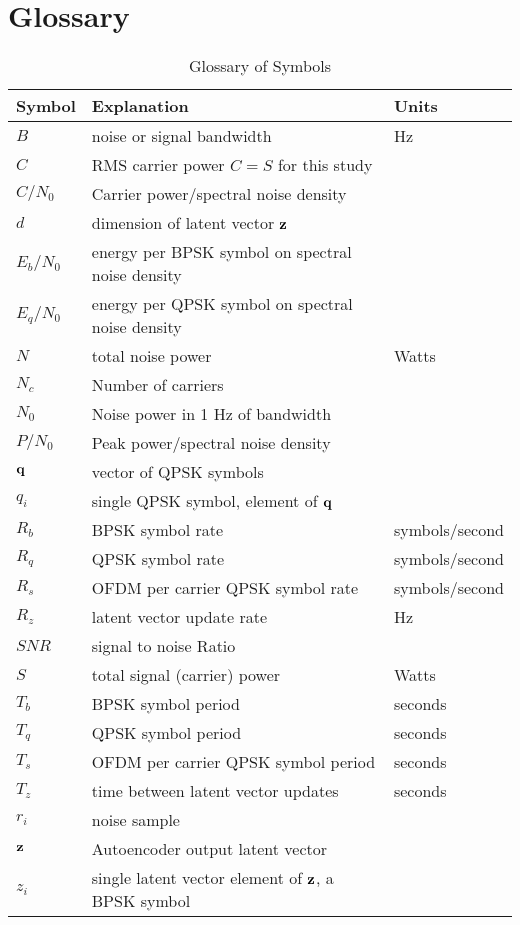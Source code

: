 \documentclass{article}
\begin{document}
\section{Glossary}

\begin{table} [H]
\centering
\begin{tabular}{l l l}
 \hline
 Symbol & Explanation & Units \\
 \hline
 $B$ & noise or signal bandwidth & Hz \\
 $C$ & RMS carrier power $C=S$ for this study \\
 $C/N_0$ & Carrier power/spectral noise density \\
 $d$ & dimension of latent vector $\bf{z}$ \\
 $E_b/N_0$ & energy per BPSK symbol on spectral noise density \\
 $E_q/N_0$ & energy per QPSK symbol on spectral noise density \\
 $N$ & total noise power & Watts \\
 $N_c$ & Number of carriers  \\
 $N_0$ & Noise power in 1 Hz of bandwidth  \\
 $P/N_0$ & Peak power/spectral noise density \\
 $\bf{q}$ & vector of QPSK symbols \\ 
 $q_i$ & single QPSK symbol, element of $\bf{q}$ \\ 
 $R_b$ & BPSK symbol rate & symbols/second \\
 $R_q$ & QPSK symbol rate & symbols/second \\
 $R_s$ & OFDM per carrier QPSK symbol rate & symbols/second \\
 $R_z$ & latent vector update rate & Hz \\
 $SNR$ & signal to noise Ratio \\
 $S$ & total signal (carrier) power & Watts \\
 $T_b$ & BPSK symbol period & seconds \\
 $T_q$ & QPSK symbol period & seconds \\
 $T_s$ & OFDM per carrier QPSK symbol period & seconds\\
 $T_z$ & time between latent vector updates & seconds\\
 $r_i$ & noise sample \\
 $\bf{z}$ & Autoencoder output latent vector \\ 
 $z_i$ & single latent vector element of $\bf{z}$, a BPSK symbol \\ 
 \hline
\end{tabular}
\caption{Glossary of Symbols}
\end{table}

\nocite{*}


\end{document}
